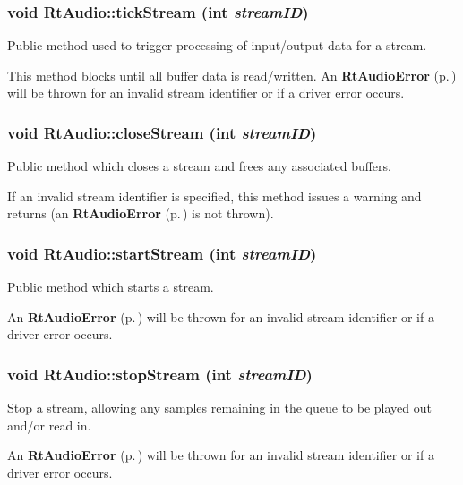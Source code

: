 \subsubsection{\setlength{\rightskip}{0pt plus 5cm}void Rt\-Audio::tick\-Stream (int {\em stream\-ID})}\label{classRtAudio_a9}


Public method used to trigger processing of input/output data for a stream.

This method blocks until all buffer data is read/written. An {\bf Rt\-Audio\-Error} {\rm (p.\,\pageref{classRtAudioError})} will be thrown for an invalid stream identifier or if a driver error occurs. 
\subsubsection{\setlength{\rightskip}{0pt plus 5cm}void Rt\-Audio::close\-Stream (int {\em stream\-ID})}\label{classRtAudio_a10}


Public method which closes a stream and frees any associated buffers.

If an invalid stream identifier is specified, this method issues a warning and returns (an {\bf Rt\-Audio\-Error} {\rm (p.\,\pageref{classRtAudioError})} is not thrown). 
\subsubsection{\setlength{\rightskip}{0pt plus 5cm}void Rt\-Audio::start\-Stream (int {\em stream\-ID})}\label{classRtAudio_a11}


Public method which starts a stream.

An {\bf Rt\-Audio\-Error} {\rm (p.\,\pageref{classRtAudioError})} will be thrown for an invalid stream identifier or if a driver error occurs. 
\subsubsection{\setlength{\rightskip}{0pt plus 5cm}void Rt\-Audio::stop\-Stream (int {\em stream\-ID})}\label{classRtAudio_a12}


Stop a stream, allowing any samples remaining in the queue to be played out and/or read in.

An {\bf Rt\-Audio\-Error} {\rm (p.\,\pageref{classRtAudioError})} will be thrown for an invalid stream identifier or if a driver error occurs. 
